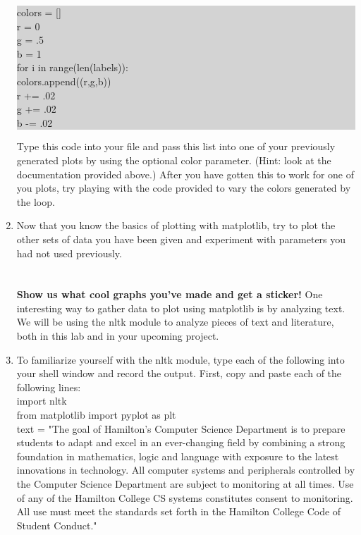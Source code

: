 \documentclass[11pt, letterpaper, onecolumn, oneside, final]{article}
\begin{document}
\begin{enumerate}
\begin{center}
\colorbox{lightgray}{\parbox{.9\textwidth}{\consolas colors = []\\
r = 0\\
g = .5\\
b = 1\\
for i in range(len(labels)):\\
\hspace*{8mm}colors.append((r,g,b))\\
\hspace*{8mm}r += .02\\
\hspace*{8mm}g += .02\\
\hspace*{8mm}b -= .02}}
\end{center}
Type this code into your file and pass this list into one of your previously generated plots by using the optional color parameter. (Hint: look at the documentation provided above.) After you have gotten this to work for one of you plots, try playing with the code provided to vary the colors generated by the loop.\\
\item Now that you know the basics of plotting with {\consolas matplotlib}, try to plot the other sets of data you have been given and experiment with parameters you had not used previously.\\\\\\
\textbf{Show us what cool graphs you've made and get a sticker!}
\newpage
One interesting way to gather data to plot using {\consolas matplotlib} is by analyzing text. We will be using the {\consolas nltk} module to analyze pieces of text and literature, both in this lab and in your upcoming project. 
\item To familiarize yourself with the {\consolas nltk} module, type each of the following into your shell window and record the output. First, copy and paste each of the following lines:\\
{\consolas import nltk\\
from matplotlib import pyplot as plt\\
text = "The goal of Hamilton’s Computer Science Department is to prepare students to adapt and excel in an ever-changing field by combining a strong foundation in mathematics, logic and language with exposure to the latest innovations in technology.
All computer systems and peripherals controlled by the Computer Science Department are subject to monitoring at all times. Use of any of the Hamilton College CS systems constitutes consent to monitoring. All use must meet the standards set forth in the Hamilton College Code of Student Conduct."}

\end{enumerate}
\end{document}
